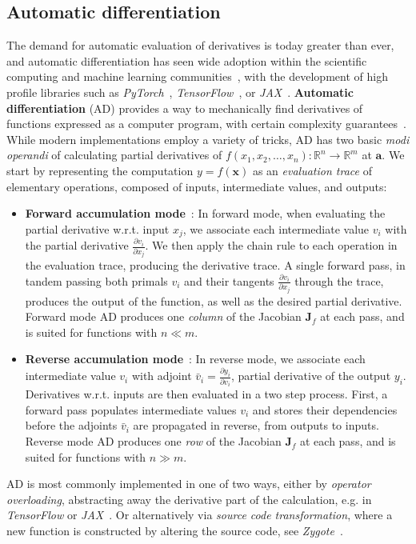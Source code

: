 \subsection{Automatic differentiation}
\label{subsec:autodiff}
The demand for automatic evaluation of derivatives is today greater than ever, and automatic differentiation has seen wide adoption within the scientific computing and machine learning communities~\cite{baydin2018automatic, lyu2013automatic, tamayo2018automatic}, with the development of high profile libraries such as \emph{PyTorch}~\cite{paszke2017automatic}, \emph{TensorFlow}~\cite{abadi2016tensorflow}, or \emph{JAX}~\cite{jax2018github}. \textbf{Automatic differentiation} (AD) provides a way to mechanically find derivatives of functions expressed as a computer program, with certain complexity guarantees~\cite{barak2016history}. While modern implementations employ a variety of tricks, AD has two basic \emph{modi operandi} of calculating partial derivatives of $f(x_1, x_2, \ldots, x_n): \mathbb{R}^n \rightarrow \mathbb{R}^m$ at $\mathbf{a}$. We start by representing the computation $y = f(\mathbf{x})$ as an \emph{evaluation trace} of elementary operations, composed of inputs, intermediate values, and outputs:
\begin{itemize}
	\item \textbf{Forward accumulation mode}~\cite{wengert1964simple}:  In forward mode, when evaluating the partial derivative w.r.t. input $x_j$, we associate each intermediate value $v_i$ with the partial derivative $\frac{\partial v_i}{\partial x_j}$. We then apply the chain rule to each operation in the evaluation trace, producing the derivative trace. A single forward pass, in tandem passing both primals $v_i$ and their tangents $\frac{\partial v_i}{\partial x_j}$ through the trace, produces the output of the function, as well as the desired partial derivative. Forward mode AD produces one \emph{column} of the Jacobian $\textbf{J}_f$ at each pass, and is suited for functions with $n \ll m$.
	
	\item \textbf{Reverse accumulation mode}~\cite{speelpenning1980compiling}: In reverse mode, we associate each intermediate value $v_i$ with adjoint $\bar{v}_i = \frac{\partial y_i}{\partial v_i}$, partial derivative of the output $y_i$. Derivatives w.r.t. inputs are then evaluated in a two step process. First, a forward pass populates intermediate values $v_i$ and stores their dependencies before the adjoints $\bar{v}_i$ are propagated in reverse, from outputs to inputs. Reverse mode AD produces one \emph{row} of the Jacobian $\textbf{J}_f$ at each pass, and is suited for functions with $n \gg m$.
\end{itemize}
AD is most commonly implemented in one of two ways, either by \emph{operator overloading}, abstracting away the derivative part of the calculation, e.g. in \emph{TensorFlow} or \emph{JAX}~\cite{abadi2016tensorflow, jax2018github}. Or alternatively via \emph{source code transformation}, where a new function is constructed by altering the source code, see \emph{Zygote}~\cite{innes2018don}.

